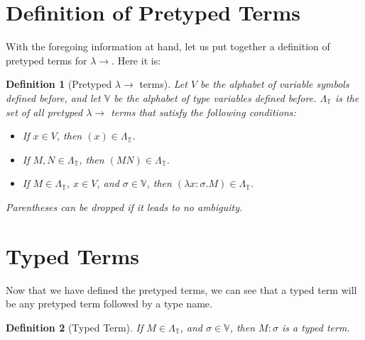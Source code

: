 \documentclass{book}
\numberwithin{equation}{chapter}
\newtheorem{definition}{Definition}
\begin{document}
\section{Definition of Pretyped Terms}

With the foregoing information at hand, let us put together a definition of pretyped terms for $\lambda\rightarrow$. Here it is:

\begin{definition}[Pretyped $\lambda\rightarrow$ terms]
Let $V$ be the alphabet of variable symbols defined before, and let $\mathbb{V}$ be the alphabet of type variables defined before. $\Lambda_{\mathbb{T}}$ is the set of all pretyped $\lambda\rightarrow$ terms that satisfy the following conditions:

\begin{itemize}

\item{If $x \in V$, then $(x) \in \Lambda_{\mathbb{T}}$.}

\item{If $M, N \in \Lambda_{\mathbb{T}}$, then $(M N) \in \Lambda_{\mathbb{T}}$.}

\item{If $M \in \Lambda_{\mathbb{T}}$, $x \in V$, and $\sigma \in \mathbb{V}$, then  $(\lambda x : \sigma.M) \in \Lambda_{\mathbb{T}}$.}

\end{itemize}

\noindent
Parentheses can be dropped if it leads to no ambiguity.

\end{definition}



\section{Typed Terms}

Now that we have defined the pretyped terms, we can see that a typed term will be any pretyped term followed by a type name.

\begin{definition}[Typed Term]
If $M \in \Lambda_{\mathbb{T}}$, and $\sigma \in \mathbb{V}$, then $M : \sigma$ is a typed term.
\end{definition}


\end{document}
